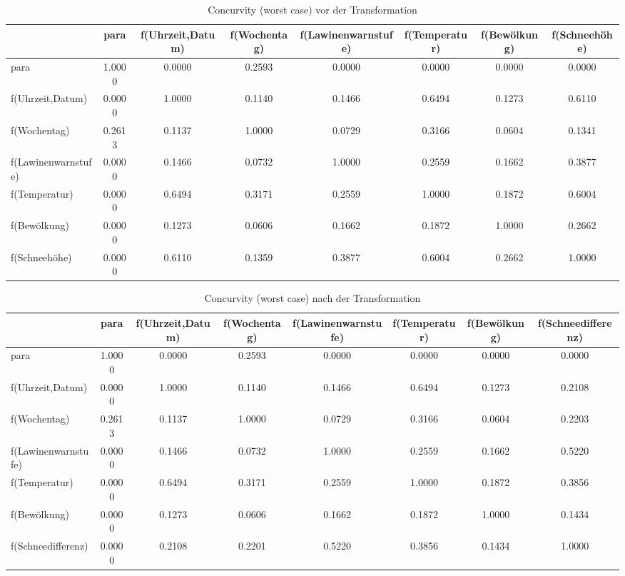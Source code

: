 \begin{table}[htbp]
	\centering
	\vspace{-1em}
	\caption{Concurvity (worst case) vor der Transformation}
	\begin{adjustbox}{max width=\textwidth}
	\begin{tabular}{lccccccc}
		& para & f(Uhrzeit,Datum) & f(Wochentag) & f(Lawinenwarnstufe) & f(Temperatur) & f(Bewölkung) & f(Schneehöhe) \\
		\midrule
		\midrule
		para  & 1.0000 & 0.0000 & 0.2593 & 0.0000 & 0.0000 & 0.0000 & 0.0000 \\
		f(Uhrzeit,Datum) & 0.0000 & 1.0000 & 0.1140 & 0.1466 & 0.6494 & 0.1273 & \cellcolor{blue!25}0.6110 \\
		f(Wochentag) & 0.2613 & 0.1137 & 1.0000 & 0.0729 & 0.3166 & 0.0604 & 0.1341 \\
		f(Lawinenwarnstufe) & 0.0000 & 0.1466 & 0.0732 & 1.0000 & 0.2559 & 0.1662 & 0.3877 \\
		f(Temperatur) & 0.0000 & 0.6494 & 0.3171 & 0.2559 & 1.0000 & 0.1872 & \cellcolor{blue!25}0.6004 \\
		f(Bewölkung) & 0.0000 & 0.1273 & 0.0606 & 0.1662 & 0.1872 & 1.0000 & 0.2662 \\
		f(Schneehöhe) & 0.0000 & 0.6110  & 0.1359 & 0.3877 & 0.6004 & 0.2662 & 1.0000 \\
		\bottomrule
	\end{tabular}%
	\label{con1}%
	\end{adjustbox}
\end{table}%

\begin{table}[htbp]
	\centering
	\caption{Concurvity (worst case) nach der Transformation}
	\begin{adjustbox}{max width=\textwidth}
	\begin{tabular}{lccccccc}
		& para & f(Uhrzeit,Datum) & f(Wochentag) & f(Lawinenwarnstufe) & f(Temperatur) & f(Bewölkung) & f(Schneedifferenz) \\
		\midrule
		\midrule
		para  & 1.0000 & 0.0000 & 0.2593 & 0.0000 & 0.0000 & 0.0000 & 0.0000 \\
		f(Uhrzeit,Datum) & 0.0000 & 1.0000 & 0.1140 & 0.1466 & 0.6494 & 0.1273 & \cellcolor{blue!25}0.2108 \\
		f(Wochentag) & 0.2613 & 0.1137 & 1.0000 & 0.0729 & 0.3166 & 0.0604 & 0.2203 \\
		f(Lawinenwarnstufe) & 0.0000 & 0.1466 & 0.0732 & 1.0000 & 0.2559 & 0.1662 & 0.5220 \\
		f(Temperatur) & 0.0000 & 0.6494 & 0.3171 & 0.2559 & 1.0000 & 0.1872 & \cellcolor{blue!25}0.3856 \\
		f(Bewölkung) & 0.0000 & 0.1273 & 0.0606 & 0.1662 & 0.1872 & 1.0000 & 0.1434 \\
		f(Schneedifferenz) & 0.0000 & 0.2108 & 0.2201 & 0.5220 & 0.3856 & 0.1434 & 1.0000 \\
		\bottomrule
	\end{tabular}%
	\label{con2}%
	\end{adjustbox}
\end{table}%

